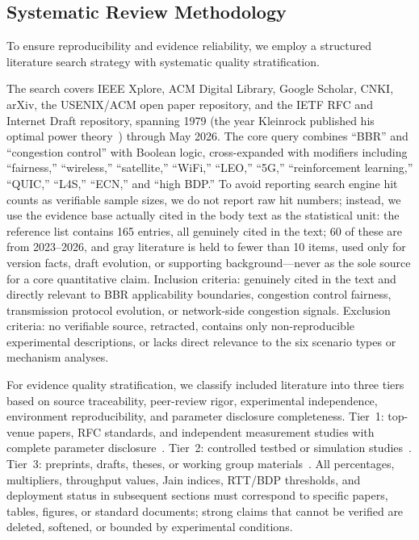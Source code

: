 \documentclass[a4paper,fleqn]{cas-sc}
\begin{document}
\subsection{Systematic Review Methodology}
\label{sec:method}

To ensure reproducibility and evidence reliability, we employ a structured
literature search strategy with systematic quality stratification.

The search covers IEEE Xplore, ACM Digital Library, Google Scholar, CNKI, arXiv,
the USENIX/ACM open paper repository, and the IETF RFC and Internet Draft
repository, spanning 1979 (the year Kleinrock published his optimal power
theory~\citep{kleinrock1979power}) through May 2026. The core query combines
``BBR'' and ``congestion control'' with Boolean logic, cross-expanded with
modifiers including ``fairness,'' ``wireless,'' ``satellite,'' ``WiFi,'' ``LEO,''
``5G,'' ``reinforcement learning,'' ``QUIC,'' ``L4S,'' ``ECN,'' and ``high BDP.''
To avoid reporting search engine hit counts as verifiable sample sizes, we do not
report raw hit numbers; instead, we use the evidence base actually cited in the
body text as the statistical unit: the reference list contains 165 entries, all
genuinely cited in the text; 60 of these are from 2023--2026, and gray literature
is held to fewer than 10 items, used only for version facts, draft evolution, or
supporting background---never as the sole source for a core quantitative claim.
Inclusion criteria: genuinely cited in the text and directly relevant to BBR
applicability boundaries, congestion control fairness, transmission protocol
evolution, or network-side congestion signals. Exclusion criteria: no verifiable
source, retracted, contains only non-reproducible experimental descriptions, or
lacks direct relevance to the six scenario types or mechanism analyses.

For evidence quality stratification, we classify included literature into three
tiers based on source traceability, peer-review rigor, experimental independence,
environment reproducibility, and parameter disclosure completeness. Tier~1:
top-venue papers, RFC standards, and independent measurement studies with complete
parameter disclosure~\citep{jaeger2019bbr,scholz2018deeper,gomez2024bbrv3,rfc9000,rfc9002,rfc9114,rfc9330,rfc9331,rfc9332}.
Tier~2: controlled testbed or simulation
studies~\citep{hock2017bbr,piotrowska2024,cao2019bbr}. Tier~3: preprints,
drafts, theses, or working group
materials~\citep{ma2017fairness,sologon2025thesis,cardwell2019bbrv2,cardwell2023bbrv3,ietf_ccwg_bbr}.
All percentages, multipliers, throughput values, Jain indices, RTT/BDP thresholds,
and deployment status in subsequent sections must correspond to specific papers,
tables, figures, or standard documents; strong claims that cannot be verified are
deleted, softened, or bounded by experimental conditions.
\end{document}
